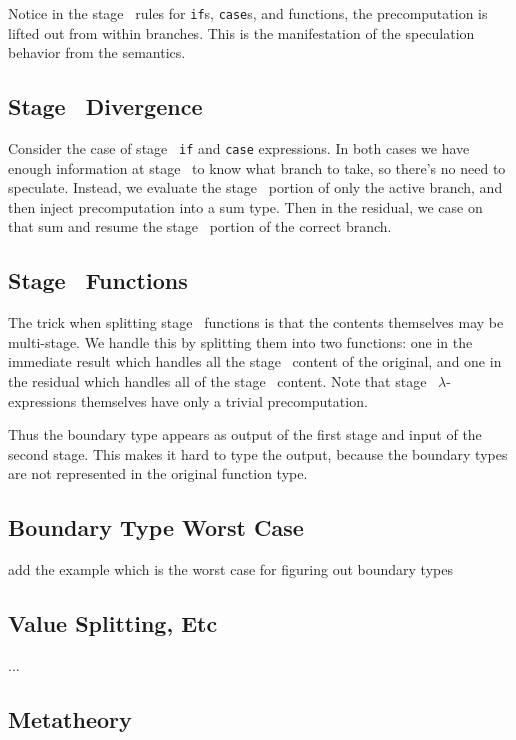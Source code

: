 Notice in the stage \bbtwo\ rules for {\tt if}s, {\tt case}s, and functions, the precomputation is lifted out from within branches.
This is the manifestation of the speculation behavior from the semantics.

\subsection {Stage \bbone\ Divergence}
Consider the case of stage \bbone\ {\tt if} and {\tt case} expressions.
In both cases we have enough information at stage \bbone\ to know what branch to take, so there's no need to speculate.
Instead, we evaluate the stage \bbone\ portion of only the active branch, and then inject precomputation into a sum type.
Then in the residual, we case on that sum and resume the stage \bbtwo\ portion of the correct branch.

\subsection {Stage \bbone\ Functions}

The trick when splitting stage \bbone\ functions is that the contents themselves may be multi-stage.
We handle this by splitting them into two functions:
one in the immediate result which handles all the stage \bbone\ content of the original,
and one in the residual which handles all of the stage \bbtwo\ content.
Note that stage \bbone\ $\lambda$-expressions themselves have only a trivial precomputation.


Thus the boundary type appears as output of the first stage and input of the second stage.
This makes it hard to type the output, because the boundary types are not represented in the original function type.

\subsection {Boundary Type Worst Case}

\TODO add the example which is the worst case for figuring out boundary types



\subsection{Value Splitting, Etc}

...

\subsection{Metatheory}

